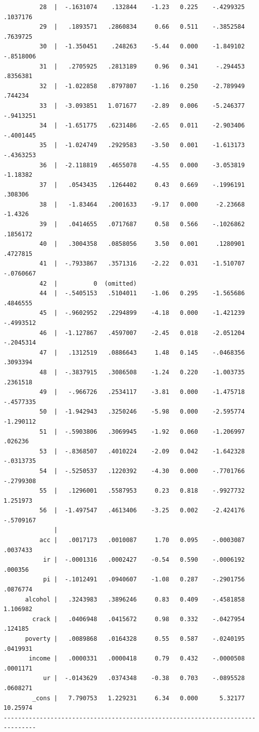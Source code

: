 \documentclass[
]{book}
\begin{document}
\begin{verbatim}
          28  |  -.1631074    .132844    -1.23   0.225    -.4299325    .1037176
          29  |   .1893571   .2860834     0.66   0.511    -.3852584    .7639725
          30  |  -1.350451    .248263    -5.44   0.000    -1.849102   -.8518006
          31  |   .2705925   .2813189     0.96   0.341     -.294453    .8356381
          32  |  -1.022858   .8797807    -1.16   0.250    -2.789949     .744234
          33  |  -3.093851   1.071677    -2.89   0.006    -5.246377   -.9413251
          34  |  -1.651775   .6231486    -2.65   0.011    -2.903406   -.4001445
          35  |  -1.024749   .2929583    -3.50   0.001    -1.613173   -.4363253
          36  |  -2.118819   .4655078    -4.55   0.000    -3.053819    -1.18382
          37  |   .0543435   .1264402     0.43   0.669    -.1996191     .308306
          38  |   -1.83464   .2001633    -9.17   0.000     -2.23668     -1.4326
          39  |   .0414655   .0717687     0.58   0.566    -.1026862    .1856172
          40  |   .3004358   .0858056     3.50   0.001     .1280901    .4727815
          41  |  -.7933867   .3571316    -2.22   0.031    -1.510707   -.0760667
          42  |          0  (omitted)
          44  |  -.5405153   .5104011    -1.06   0.295    -1.565686    .4846555
          45  |  -.9602952   .2294899    -4.18   0.000    -1.421239   -.4993512
          46  |  -1.127867   .4597007    -2.45   0.018    -2.051204   -.2045314
          47  |   .1312519   .0886643     1.48   0.145    -.0468356    .3093394
          48  |  -.3837915   .3086508    -1.24   0.220    -1.003735    .2361518
          49  |   -.966726   .2534117    -3.81   0.000    -1.475718   -.4577335
          50  |  -1.942943   .3250246    -5.98   0.000    -2.595774   -1.290112
          51  |  -.5903806   .3069945    -1.92   0.060    -1.206997     .026236
          53  |  -.8368507   .4010224    -2.09   0.042    -1.642328   -.0313735
          54  |  -.5250537   .1220392    -4.30   0.000    -.7701766   -.2799308
          55  |   .1296001   .5587953     0.23   0.818    -.9927732    1.251973
          56  |  -1.497547   .4613406    -3.25   0.002    -2.424176   -.5709167
              |
          acc |   .0017173   .0010087     1.70   0.095    -.0003087    .0037433
           ir |  -.0001316   .0002427    -0.54   0.590    -.0006192     .000356
           pi |  -.1012491   .0940607    -1.08   0.287    -.2901756    .0876774
      alcohol |   .3243983   .3896246     0.83   0.409    -.4581858    1.106982
        crack |   .0406948   .0415672     0.98   0.332    -.0427954     .124185
      poverty |   .0089868   .0164328     0.55   0.587    -.0240195    .0419931
       income |   .0000331   .0000418     0.79   0.432    -.0000508    .0001171
           ur |  -.0143629   .0374348    -0.38   0.703    -.0895528    .0608271
        _cons |   7.790753   1.229231     6.34   0.000      5.32177    10.25974
-------------------------------------------------------------------------------
\end{verbatim}
\end{document}
